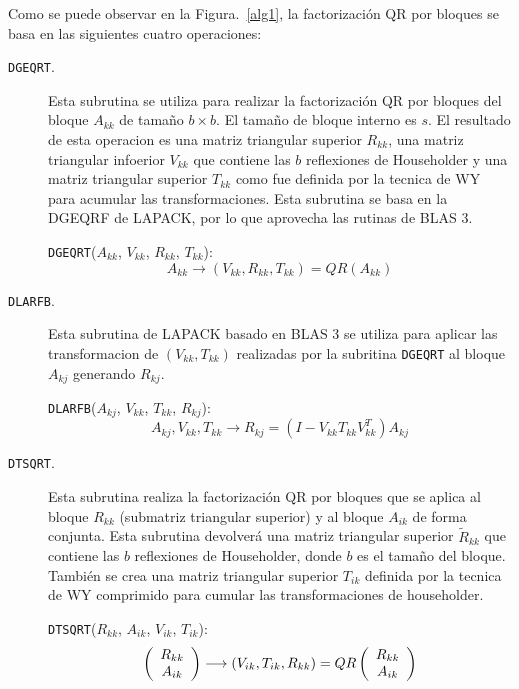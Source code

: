 \documentclass[12pt]{article}
\begin{document}
Como se puede observar en la Figura.~\ref{alg1}, la factorización QR por bloques se basa en las siguientes cuatro operaciones:

\begin{description}
\item[\texttt{DGEQRT}.] Esta subrutina se utiliza para realizar la factorización QR por bloques del bloque $A_{kk}$ de tamaño $b \times b$. El tamaño de bloque interno es $s$. El resultado de esta operacion es una matriz triangular superior $R_{kk}$, una matriz triangular infoerior $V_{kk}$ que contiene las $b$ reflexiones de Householder y una matriz triangular superior $T_{kk}$  como fue definida por la tecnica de WY para acumular las transformaciones. Esta subrutina se basa en la DGEQRF de LAPACK, por lo que aprovecha las rutinas de BLAS 3.

  \texttt{DGEQRT}($A_{kk}$, $V_{kk}$, $R_{kk}$, $T_{kk}$):
  \begin{displaymath}
    A_{kk} \longrightarrow (V_{kk}, R_{kk}, T_{kk})=QR(A_{kk})
  \end{displaymath}

\item[\texttt{DLARFB}.] Esta subrutina de LAPACK basado en BLAS 3 se utiliza para aplicar las transformacion de $(V_{kk}, T_{kk})$ realizadas por la subritina \texttt{DGEQRT} al bloque $A_{kj}$ generando $R_{kj}$.

  \texttt{DLARFB}($A_{kj}$, $V_{kk}$, $T_{kk}$, $R_{kj}$):
  \begin{displaymath}
    A_{kj}, V_{kk}, T_{kk} \longrightarrow R_{kj}=(I-V_{kk}T_{kk}V^T_{kk})A_{kj}
  \end{displaymath}

\item[\texttt{DTSQRT}.] Esta subrutina realiza la factorización QR por bloques que se aplica al bloque $R_{kk}$ (submatriz triangular superior) y al bloque $A_{ik}$ de forma conjunta. Esta subrutina devolverá una matriz triangular superior $\tilde{R}_{kk}$ que contiene las $b$ reflexiones de Householder, donde $b$ es el tamaño del bloque. También se crea una matriz triangular superior $T_{ik}$ definida por la tecnica de WY comprimido para cumular las transformaciones de householder.
 
  \texttt{DTSQRT}($R_{kk}$, $A_{ik}$, $V_{ik}$, $T_{ik}$):
  \begin{displaymath}
    \left(
      \begin{array}[!h]{c}
        R_{kk}\\
        A_{ik}
      \end{array}\right) \longrightarrow
        (V_{ik}, T_{ik}, R_{kk})=QR\left(\begin{array}[!h]{c}
        R_{kk}\\
        A_{ik}
      \end{array}\right)
  \end{displaymath}



\end{description}
\end{document}
